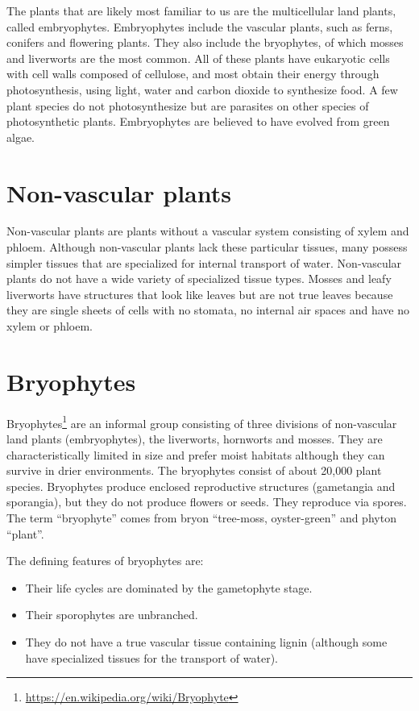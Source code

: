 \documentclass[]{book}
\providecommand{\tightlist}{%
  \setlength{\itemsep}{0pt}\setlength{\parskip}{0pt}}
\let\rmarkdownfootnote\footnote%
\def\footnote{\protect\rmarkdownfootnote}
\renewcommand{\href}[2]{#2\footnote{\url{#1}}}
\begin{document}
The plants that are likely most familiar to us are the multicellular land plants, called embryophytes. Embryophytes include the vascular plants, such as ferns, conifers and flowering plants. They also include the bryophytes, of which mosses and liverworts are the most common. All of these plants have eukaryotic cells with cell walls composed of cellulose, and most obtain their energy through photosynthesis, using light, water and carbon dioxide to synthesize food. A few plant species do not photosynthesize but are parasites on other species of photosynthetic plants. Embryophytes are believed to have evolved from green algae.

\hypertarget{non-vascular-plants}{%
\section{Non-vascular plants}\label{non-vascular-plants}}

Non-vascular plants are plants without a vascular system consisting of xylem and phloem. Although non-vascular plants lack these particular tissues, many possess simpler tissues that are specialized for internal transport of water. Non-vascular plants do not have a wide variety of specialized tissue types. Mosses and leafy liverworts have structures that look like leaves but are not true leaves because they are single sheets of cells with no stomata, no internal air spaces and have no xylem or phloem.

\hypertarget{bryophytes}{%
\section{Bryophytes}\label{bryophytes}}

\href{https://en.wikipedia.org/wiki/Bryophyte}{Bryophytes} are an informal group consisting of three divisions of non-vascular land plants (embryophytes), the liverworts, hornworts and mosses. They are characteristically limited in size and prefer moist habitats although they can survive in drier environments. The bryophytes consist of about 20,000 plant species. Bryophytes produce enclosed reproductive structures (gametangia and sporangia), but they do not produce flowers or seeds. They reproduce via spores. The term ``bryophyte'' comes from bryon ``tree-moss, oyster-green'' and phyton ``plant''.

The defining features of bryophytes are:

\begin{itemize}
\tightlist
\item
  Their life cycles are dominated by the gametophyte stage.
\item
  Their sporophytes are unbranched.
\item
  They do not have a true vascular tissue containing lignin (although some have specialized tissues for the transport of water).
\end{itemize}
\end{document}
